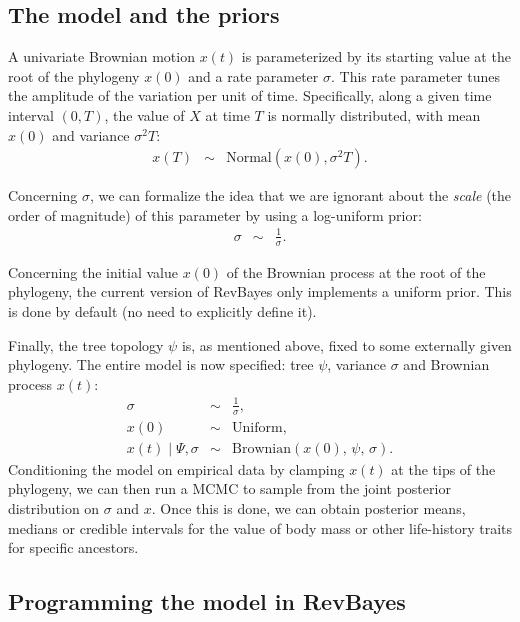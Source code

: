 \documentclass[usletter]{article}
\begin{document}
\subsection*{The model and the priors}

A univariate Brownian motion $x(t)$ is parameterized by its starting value at the root of the phylogeny $x(0)$ and a rate parameter $\sigma$. This rate parameter tunes the amplitude of the variation per unit of time. Specifically, along a given time interval $(0,T)$, the value of $X$ at time $T$ is normally distributed, with mean $x(0)$ and variance $\sigma^2 T$:
\begin{eqnarray*}
x(T) &\sim& \text{Normal} \left( x(0), \sigma^2 T \right).
\end{eqnarray*}

Concerning $\sigma$, we can formalize the idea that we are ignorant about the \emph{scale} (the order of magnitude) of this parameter by using a log-uniform prior:
\begin{eqnarray*}
\sigma &\sim& \frac{1}{\sigma}.
\end{eqnarray*}

Concerning the initial value $x(0)$ of the Brownian process at the root of the phylogeny,
the current version of RevBayes only implements a uniform prior.
This is done by default (no need to explicitly define it).

Finally, the tree topology $\psi$ is, as mentioned above, fixed to some externally given phylogeny.
The entire model is now specified: tree $\psi$, variance $\sigma$ and Brownian process $x(t)$:
\begin{eqnarray*}
\sigma &\sim& \frac{1}{\sigma},
\\
x(0) &\sim& \text{Uniform},
\\
x(t) \mid \Psi, \sigma &\sim& \text{Brownian} \left( x(0), \, \psi, \, \sigma \right).
\end{eqnarray*}
Conditioning the model on empirical data by clamping $x(t)$ at the tips of the phylogeny, we can then run a MCMC to sample from the joint posterior distribution on $\sigma$ and $x$. Once this is done, we can obtain posterior means, medians or credible intervals for the value of body mass or other life-history traits for specific ancestors.


\subsection*{Programming the model in RevBayes}
\end{document}
